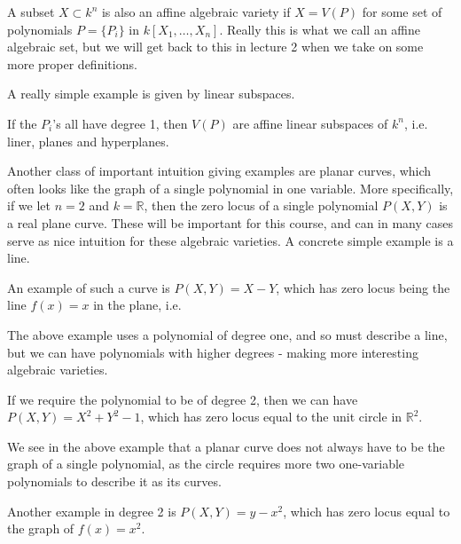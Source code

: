 A subset $X\subset k^n$ is also an affine algebraic variety if $X = V(P)$ for some set of polynomials $P=\{ P_i\}$ in $k[X_1, \ldots, X_n]$. Really this is what we call an affine algebraic set, but we will get back to this in lecture 2 when we take on some more proper definitions. 

A really simple example is given by linear subspaces.

\begin{example}
If the $P_i$'s all have degree 1, then $V(P)$ are affine linear subspaces of $k^n$, i.e. liner, planes and hyperplanes. 
\end{example}

Another class of important intuition giving examples are planar curves, which often looks like the graph of a single polynomial in one variable. More specifically, if we let $n=2$ and $k=\mathbb{R}$, then the zero locus of a single polynomial $P(X, Y)$ is a real plane curve.  These will be important for this course, and can in many cases serve as nice intuition for these algebraic varieties. A concrete simple example is a line.  

\begin{example}
An example of such a curve is $P(X, Y) = X-Y$, which has zero locus being the line $f(x)=x$ in the plane, i.e.
\begin{center}
\def\svgwidth{0.4\textwidth}

\end{center}
\end{example}

The above example uses a polynomial of degree one, and so must describe a line, but we can have polynomials with higher degrees - making more interesting algebraic varieties.  

\begin{example}
If we require the polynomial to be of degree 2, then we can have $P(X, Y)=X^2+Y^2-1$, which has zero locus equal to the unit circle in $\mathbb{R}^2$. 
\begin{center}
\def\svgwidth{0.4\textwidth}

\end{center}
\end{example}

We see in the above example that a planar curve does not always have to be the graph of a single polynomial, as the circle requires more two one-variable polynomials to describe it as its curves. 

\begin{example}
Another example in degree 2 is $P(X, Y) = y-x^2$, which has zero locus equal to the graph of $f(x)=x^2$.
\begin{center}
\def\svgwidth{0.4\textwidth}

\end{center}
\end{example}

